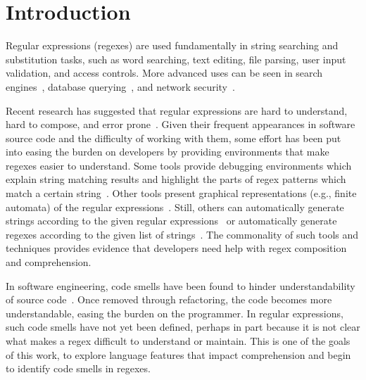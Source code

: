 \section{Introduction }

Regular expressions (regexes) are used fundamentally in string searching and substitution tasks, such as word searching, text editing, file parsing, user input validation, and access controls. More advanced uses  can be seen in search engines~\cite{zhao2005fully}, database querying~\cite{Yeole:2011:ADT:1980022.1980229}, and network security~\cite{network,hutchings2002assisting,ficara2008improved}.

Recent research has suggested that regular expressions are hard to understand, hard to compose, and error prone~\cite{Spishak:2012:TSR:2318202.2318207}. Given their frequent appearances in software source code and the difficulty of working with them, some effort has been put into easing the burden on developers by providing environments that make regexes easier to understand. Some tools provide debugging environments which explain string matching results and highlight the parts of regex patterns which match a certain string~\cite{regex101,regexr}. Other tools present graphical representations (e.g., finite automata) of the regular expressions~\cite{regexper,rise4fun}. Still, others can automatically generate strings according to the given regular expressions~\cite{hampi,rex} or automatically generate regexes according to the given list of strings~\cite{Babbar:2010:CBA:1871840.1871848, Li:2008:REL:1613715.1613719}.
The commonality of such tools and techniques provides evidence that developers need help with regex composition and comprehension.

In software engineering, code smells have been found to hinder understandability of source code~\cite{abbes2011empirical, du2006does}.
Once removed through refactoring, the code becomes more understandable, easing the burden on the programmer.
In regular expressions, such code smells have not yet been defined, perhaps in part because it is not clear what makes a regex difficult to understand or maintain.
This is one of the goals of this work, to explore language features that impact comprehension and begin to identify code smells in regexes. 

